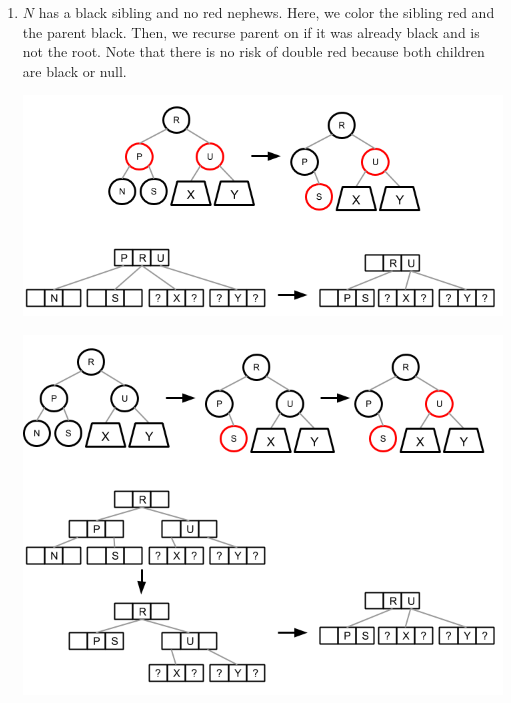 \documentclass[12pt]{article}
\begin{document}
\begin{enumerate}
\begin{enumerate}
    \item \label{bleaf_bsib2} $N$ has a black sibling and no red nephews. Here, we color the sibling red and the parent black. Then, we recurse parent on if it was already black and is not the root. Note that there is no risk of double red because both children are black or null.
    \begin{center}
      \includegraphics[scale=0.5]{pics/red_black_tree/del_bleaf_bsib_bnephs_rpar}
    \end{center}
    \begin{center}
      \includegraphics[scale=0.5]{pics/red_black_tree/del_bleaf_bsib_bnephs_bpar}
    \end{center}


\end{enumerate}
\end{enumerate}
\end{document}
